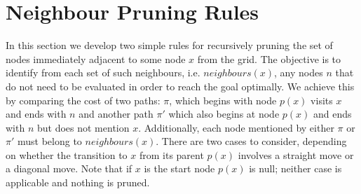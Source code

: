 \section{Neighbour Pruning Rules} 
\label{cha::jps::pruning}

In this section we develop two simple rules for recursively pruning the set of
nodes immediately adjacent to some node $x$ from the grid.  The objective is
to identify from each set of such neighbours, i.e. $neighbours(x)$, any nodes
$n$ that do not need to be evaluated in order to reach the goal optimally. We
achieve this by comparing the cost of two paths: $\pi$, which begins with
node $p(x)$ visits $x$ and ends with $n$ and another path $\pi'$ which also
begins at node $p(x)$ and ends with $n$ but does not mention $x$.
Additionally, each node mentioned by either $\pi$ or $\pi'$ must belong to
$neighbours(x)$. There are two cases to consider, depending on
whether the transition to $x$ from its parent $p(x)$ involves a straight move or
a diagonal move. Note that if $x$ is the start node $p(x)$ is null; neither case is
applicable and nothing is pruned.

